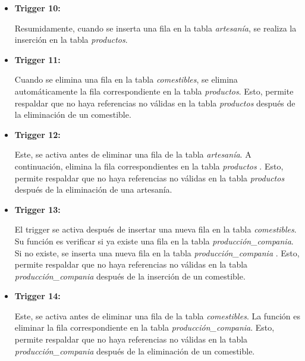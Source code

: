\documentclass[11pt]{report}
\begin{document}
\begin{itemize}
      \item \textbf{Trigger 10:} 
            \lstset{style=mystyle}
            

Resumidamente, cuando se inserta una fila en la tabla \emph{artesanía}, se realiza la inserción en la tabla \emph{productos}.

      \item \textbf{Trigger 11:} 
            \lstset{style=mystyle}
            

Cuando se elimina una fila en la tabla \emph{comestibles}, se elimina automáticamente la fila correspondiente en la tabla \emph{productos}. Esto, permite respaldar que no haya referencias no válidas en la tabla \emph{productos} después de la eliminación de un comestible.

      \item \textbf{Trigger 12:} 
            \lstset{style=mystyle}
            

Este, se activa antes de eliminar una fila de la tabla \emph{artesanía}. A continuación, elimina la fila correspondientes en la tabla \emph{productos }. Esto, permite respaldar que no haya referencias no válidas en la tabla \emph{productos} después de la eliminación de una artesanía.

      \item \textbf{Trigger 13:} 
            \lstset{style=mystyle}
            

El trigger se activa después de insertar una nueva fila en la tabla \emph{comestibles}. Su función es verificar si ya existe una fila en la tabla \emph{producción\_compania}. Si no existe, se inserta una nueva fila en la tabla \emph{producción\_compania} . Esto, permite respaldar que no haya referencias no válidas en la tabla \emph{producción\_compania} después de la inserción de un comestible.

      \item \textbf{Trigger 14:} 
            \lstset{style=mystyle}
            

Este, se activa antes de eliminar una fila de la tabla \emph{comestibles}. La función es eliminar la fila correspondiente en la tabla \emph{producción\_compania}. Esto, permite respaldar que no haya referencias no válidas en la tabla \emph{producción\_compania} después de la eliminación de un comestible.


\end{itemize}
\end{document}
